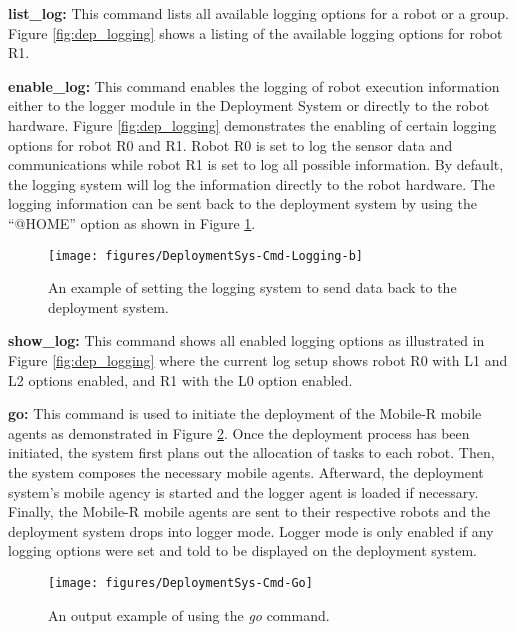     \textbf{list\_log:}
      This command lists all available logging options for a robot or a group.
      Figure \ref{fig:dep_logging} shows a listing of the available logging
        options for robot R1.

    \textbf{enable\_log:}
      This command enables the logging of robot execution information either 
        to the logger module in the Deployment System or directly to the robot
        hardware.
      Figure \ref{fig:dep_logging} demonstrates the enabling of certain logging
        options for robot R0 and R1.
      Robot R0 is set to log the sensor data and communications while robot R1
        is set to log all possible information.
      By default, the logging system will log the information directly to the
        robot hardware.
      The logging information can be sent back to the deployment system by
        using the ``@HOME'' option as shown in Figure \ref{fig:dep_logging-b}.

      \begin{figure}%
      \centerline{
          \texttt{[image: figures/DeploymentSys-Cmd-Logging-b]}}
      \caption{An example of setting the logging system to send data back to the
               deployment system.}
      \label{fig:dep_logging-b}
      \end{figure}

    \textbf{show\_log:}
      This command shows all enabled logging options as illustrated in Figure
        \ref{fig:dep_logging} where the current log setup shows robot R0 with
        L1 and L2 options enabled, and R1 with the L0 option enabled.

    \textbf{go:}
      This command is used to initiate the deployment of the Mobile-R
        mobile agents as demonstrated in Figure \ref{fig:dep_go}.
      Once the deployment process has been initiated, the system first plans
        out the allocation of tasks to each robot.
      Then, the system composes the necessary mobile agents.
      Afterward, the deployment system's mobile agency is started and the logger
        agent is loaded if necessary.
      Finally, the Mobile-R mobile agents are sent to their respective
        robots and the deployment system drops into logger mode.
      Logger mode is only enabled if any logging options were set and told to
        be displayed on the deployment system.
      \begin{figure}%
      \centerline{
          \texttt{[image: figures/DeploymentSys-Cmd-Go]}}
      \caption{An output example of using the \textit{go} command.}
      \label{fig:dep_go}
      \end{figure}

